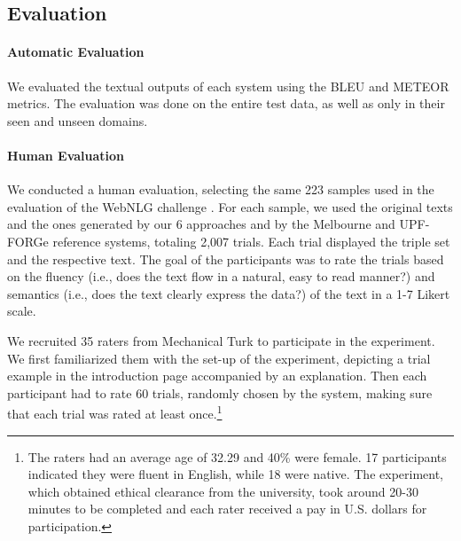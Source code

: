 \documentclass[11pt,a4paper]{article}
\begin{document}
\subsection{Evaluation}

\paragraph{Automatic Evaluation} We evaluated the textual outputs of each system using the BLEU \cite{papineni2002} and METEOR \cite{lavieAgarwal2007} metrics. The evaluation was done on the entire test data, as well as only in their seen and unseen domains.

\paragraph{Human Evaluation} We conducted a human evaluation, selecting the same 223 samples used in the evaluation of the WebNLG challenge \cite{claire2017b}. For each sample, we used the original texts and the ones generated by our 6 approaches and by the Melbourne and UPF-FORGe reference systems, totaling 2,007 trials. Each trial displayed the triple set and the respective text. The goal of the participants was to rate the trials based on the fluency (i.e., does the text flow in a natural, easy to read manner?) and semantics (i.e., does the text clearly express the data?) of the text in a 1-7 Likert scale.

We recruited 35 raters from Mechanical Turk to participate in the experiment. We first familiarized them with the set-up of the experiment, depicting a trial example in the introduction page accompanied by an explanation. Then each participant had to rate 60 trials, randomly chosen by the system, making sure that each trial was rated at least once.\footnote{The raters had an average age of 32.29 and 40\% were female. 17 participants indicated they were fluent in English, while 18 were native. The experiment, which obtained ethical clearance from the university, took around 20-30 minutes to be completed and each rater received a pay in U.S. dollars for participation.}
\end{document}
